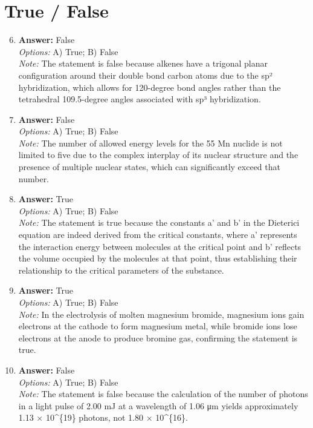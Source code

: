 \documentclass[12pt]{article}
\begin{document}
\section*{True / False}
\begin{enumerate}[label=\arabic*.]
\setcounter{enumi}{5}
\item \textbf{Answer:} False
\\ \textit{Options:} A) True; B) False
\\ \textit{Note:} The statement is false because alkenes have a trigonal planar configuration around their double bond carbon atoms due to the sp² hybridization, which allows for 120-degree bond angles rather than the tetrahedral 109.5-degree angles associated with sp³ hybridization.
\item \textbf{Answer:} False
\\ \textit{Options:} A) True; B) False
\\ \textit{Note:} The number of allowed energy levels for the 55 Mn nuclide is not limited to five due to the complex interplay of its nuclear structure and the presence of multiple nuclear states, which can significantly exceed that number.
\item \textbf{Answer:} True
\\ \textit{Options:} A) True; B) False
\\ \textit{Note:} The statement is true because the constants a' and b' in the Dieterici equation are indeed derived from the critical constants, where a' represents the interaction energy between molecules at the critical point and b' reflects the volume occupied by the molecules at that point, thus establishing their relationship to the critical parameters of the substance.
\item \textbf{Answer:} True
\\ \textit{Options:} A) True; B) False
\\ \textit{Note:} In the electrolysis of molten magnesium bromide, magnesium ions gain electrons at the cathode to form magnesium metal, while bromide ions lose electrons at the anode to produce bromine gas, confirming the statement is true.
\item \textbf{Answer:} False
\\ \textit{Options:} A) True; B) False
\\ \textit{Note:} The statement is false because the calculation of the number of photons in a light pulse of 2.00 mJ at a wavelength of 1.06 μm yields approximately 1.13 × 10^\{19\} photons, not 1.80 × 10^\{16\}.
\end{enumerate}
\end{document}
